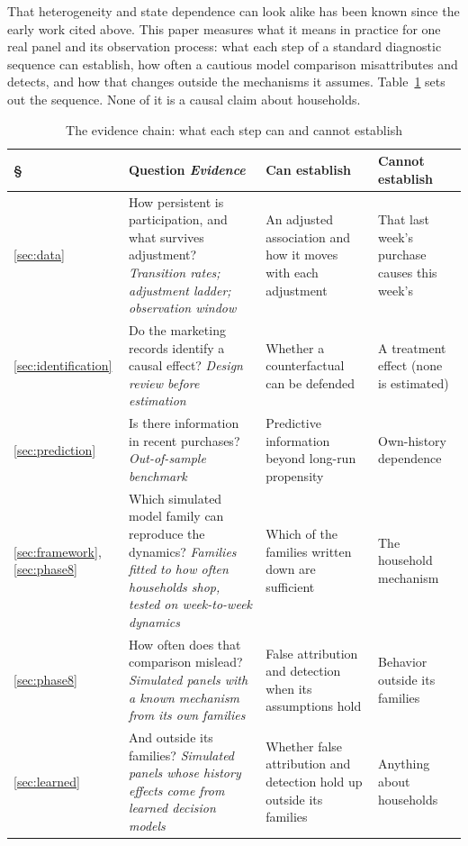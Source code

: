 \documentclass[11pt]{article}
\begin{document}
That heterogeneity and state dependence can look alike has been known since the early work
cited above. This paper measures what it means in practice for one real panel and its
observation process: what each step of a standard diagnostic sequence can establish, how
often a cautious model comparison misattributes and detects, and how that changes outside
the mechanisms it assumes. Table~\ref{tab:evidence} sets out the sequence. None of it is a
causal claim about households.

\begin{table}[htbp]
\centering\small
\caption{The evidence chain: what each step can and cannot establish}
\label{tab:evidence}
\renewcommand{\arraystretch}{1.1}
\begin{tabularx}{\textwidth}{@{}>{\raggedright\arraybackslash}p{0.7cm}>{\raggedright\arraybackslash}p{5.3cm}>{\raggedright\arraybackslash}X>{\raggedright\arraybackslash}X@{}}
\toprule
\S & Question \newline \emph{Evidence} & Can establish & Cannot establish \\
\midrule
\ref{sec:data} & How persistent is participation, and what survives adjustment? \newline \emph{Transition rates; adjustment ladder; observation window} & An adjusted association and how it moves with each adjustment & That last week's purchase causes this week's \\
\addlinespace[6pt]
\ref{sec:identification} & Do the marketing records identify a causal effect? \newline \emph{Design review before estimation} & Whether a counterfactual can be defended & A treatment effect (none is estimated) \\
\addlinespace[6pt]
\ref{sec:prediction} & Is there information in recent purchases? \newline \emph{Out-of-sample benchmark} & Predictive information beyond long-run propensity & Own-history dependence \\
\addlinespace[6pt]
\ref{sec:framework}, \ref{sec:phase8} & Which simulated model family can reproduce the dynamics? \newline \emph{Families fitted to how often households shop, tested on week-to-week dynamics} & Which of the families written down are sufficient & The household mechanism \\
\addlinespace[6pt]
\ref{sec:phase8} & How often does that comparison mislead? \newline \emph{Simulated panels with a known mechanism from its own families} & False attribution and detection when its assumptions hold & Behavior outside its families \\
\addlinespace[6pt]
\ref{sec:learned} & And outside its families? \newline \emph{Simulated panels whose history effects come from learned decision models} & Whether false attribution and detection hold up outside its families & Anything about households \\
\bottomrule
\end{tabularx}
\end{table}
\end{document}
